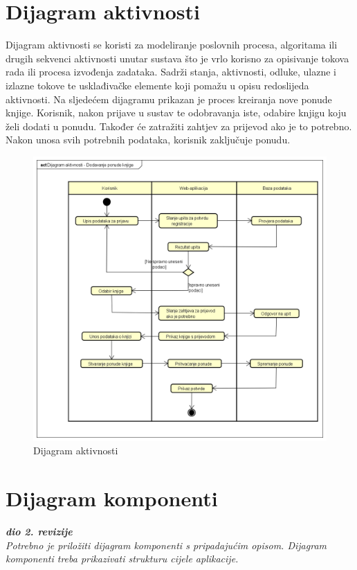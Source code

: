			
			\eject 
		
		\section{Dijagram aktivnosti}
			
			
			Dijagram aktivnosti se koristi za modeliranje poslovnih procesa, algoritama ili drugih sekvenci aktivnosti unutar sustava što je vrlo korisno za opisivanje tokova rada ili procesa izvođenja zadataka. Sadrži stanja, aktivnosti, odluke, ulazne i izlazne tokove te usklađivačke elemente koji pomažu u opisu redoslijeda aktivnosti. Na sljedećem dijagramu prikazan je proces kreiranja nove ponude knjige. Korisnik, nakon prijave u sustav te odobravanja iste, odabire knjigu koju želi dodati u ponudu. Također će zatražiti zahtjev za prijevod ako je to potrebno.
			Nakon unosa svih potrebnih podataka, korisnik zaključuje ponudu. 
			
			\eject
			
			
			\begin{figure}[H]
				\includegraphics[width=\textwidth]{dijagrami/Dijagram aktivnosti.PNG} %
				\centering
				\caption{Dijagram aktivnosti }
				\label{fig:dijagramaktivnosti1}
			\end{figure}
			
			\eject
			
		\section{Dijagram komponenti}
		
			\textbf{\textit{dio 2. revizije}}\\
		
			 \textit{Potrebno je priložiti dijagram komponenti s pripadajućim opisom. Dijagram komponenti treba prikazivati strukturu cijele aplikacije.}
